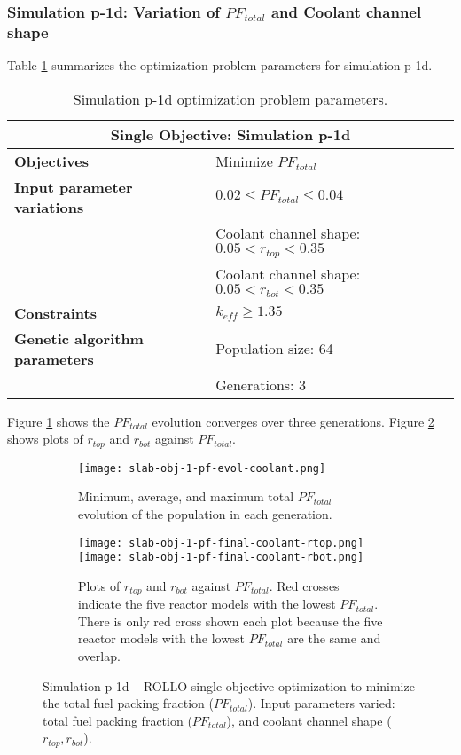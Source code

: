 \subsubsection{Simulation p-1d: Variation of $PF_{total}$ and Coolant channel shape}
Table \ref{tab:simulationp1d} summarizes the optimization problem parameters for 
simulation p-1d.  
\begin{table}[htbp!]
    \centering
    \onehalfspacing
    \caption{Simulation p-1d optimization problem parameters.}
	\label{tab:simulationp1d}
    \footnotesize
    \begin{tabular}{l|p{6.5cm}}
    \hline 
    \multicolumn{2}{c}{\textbf{Single Objective: Simulation p-1d}} \\
    \hline 
    \textbf{Objectives} & Minimize $PF_{total}$\\
    \hline 
    \textbf{Input parameter variations} & $0.02 \leq PF_{total} \leq 0.04$ \\
    & Coolant channel shape: $0.05<r_{top}<0.35$ \\
    & Coolant channel shape: $0.05<r_{bot}<0.35$ \\
    \hline
    \textbf{Constraints} & $k_{eff} \geq 1.35$\\ 
    \hline 
    \textbf{Genetic algorithm parameters} & Population size: 64 \\
    & Generations: 3 \\
    \hline
    \end{tabular}
\end{table}
Figure \ref{fig:slab-obj-1-pf-evol-coolant} shows the $PF_{total}$ evolution converges 
over three generations.  
Figure \ref{fig:slab-obj-1-pf-final-coolant} shows plots of $r_{top}$ and $r_{bot}$ 
against $PF_{total}$.  
\begin{figure}[htbp!]
    \centering
    \begin{subfigure}{\textwidth}
        \texttt{[image: slab-obj-1-pf-evol-coolant.png]}
        \caption{Minimum, average, and maximum total $PF_{total}$ evolution of the 
        population in each generation.}
        \label{fig:slab-obj-1-pf-evol-coolant} 
    \end{subfigure}
    \begin{subfigure}{\textwidth}
        \texttt{[image: slab-obj-1-pf-final-coolant-rtop.png]}
        \texttt{[image: slab-obj-1-pf-final-coolant-rbot.png]}
        \caption{Plots of $r_{top}$ and $r_{bot}$ against $PF_{total}$. 
        Red crosses indicate the five reactor models with the lowest $PF_{total}$.
        There is only red cross shown each plot because the five reactor models with the 
        lowest $PF_{total}$ are the same and overlap.}
        \label{fig:slab-obj-1-pf-final-coolant} 
    \end{subfigure}
    \caption{Simulation p-1d -- ROLLO single-objective optimization to minimize 
    the total fuel packing fraction ($PF_{total}$). 
    Input parameters varied: total fuel packing fraction 
    ($PF_{total}$), and coolant channel shape ($r_{top}, r_{bot}$).}
    \label{fig:slab-obj-1-pf-coolant}
\end{figure}
